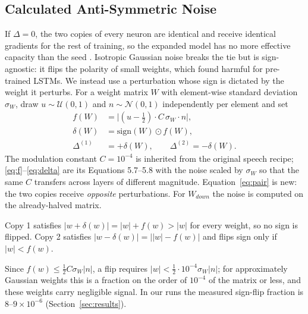 \subsection{Calculated Anti-Symmetric Noise}
\label{sec:noise}
If $\Delta=0$, the two copies of every neuron are identical and receive identical gradients for the rest of training, so the expanded model has no more effective capacity than the seed \citep{chen2015net2net}.
Isotropic Gaussian noise breaks the tie but is sign-agnostic: it flips the polarity of small weights, which \citet{irfan2021discriminative} found harmful for pre-trained LSTMs.
We instead use a perturbation whose sign is dictated by the weight it perturbs. For a weight matrix $W$ with element-wise standard deviation $\sigma_W$, draw $u\sim\mathcal{U}(0,1)$ and $n\sim\mathcal{N}(0,1)$ independently per element and set
\begin{align}
    f(W) &= \big|(u-\tfrac{1}{2})\cdot C\,\sigma_W\cdot n\big|, \label{eq:f}\\
    \delta(W) &= \mathrm{sign}(W)\odot f(W), \label{eq:delta}\\
    \Delta^{(1)} &= +\delta(W), \qquad \Delta^{(2)} = -\delta(W). \label{eq:pair}
\end{align}
The modulation constant $C=10^{-4}$ is inherited from the original speech recipe; \eqref{eq:f}--\eqref{eq:delta} are its Equations 5.7--5.8 with the noise scaled by $\sigma_W$ so that the same $C$ transfers across layers of different magnitude. Equation~\eqref{eq:pair} is new: the two copies receive \emph{opposite} perturbations. For $W_{down}$ the noise is computed on the already-halved matrix.

\begin{proposition}
\label{prop:sign}
Copy 1 satisfies $|w+\delta(w)|=|w|+f(w)>|w|$ for every weight, so no sign is flipped. Copy 2 satisfies $|w-\delta(w)|=\big||w|-f(w)\big|$ and flips sign only if $|w|<f(w)$.
\end{proposition}
Since $f(w)\leq\tfrac{1}{2}C\sigma_W|n|$, a flip requires $|w|<\tfrac{1}{2}\cdot10^{-4}\sigma_W|n|$; for approximately Gaussian weights this is a fraction on the order of $10^{-4}$ of the matrix or less, and these weights carry negligible signal. In our runs the measured sign-flip fraction is $8$--$9\times10^{-6}$ (Section~\ref{sec:results}).

